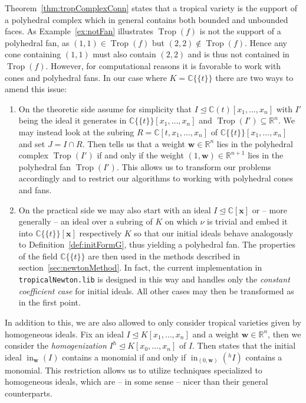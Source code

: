 \documentclass[
  paper=a4,
  titlepage,
  bibliography=totoc,
  listof=totoc,
  pagesize=pdftex
]{scrartcl}
\numberwithin{figure}{section}
\numberwithin{equation}{section}
\numberwithin{table}{section}
\newcommand*\setR{\mathds{R}}
\newcommand*\setC{\mathds{C}}
\newcommand*\puiseux[2]{#1\{\!\{#2\}\!\}}
\newcommand*\CCt{\puiseux{\setC}{t}}
\let\vec\mathbf
\let\idealof\trianglelefteq
\DeclareMathOperator{\Trop}{Trop}
\DeclareMathOperator{\initial}{in}
\theoremstyle{definition}
\numberwithin{definition}{section}
\begin{document}
Theorem~\ref{thm:tropComplexConn} states that a tropical variety is the support of a
polyhedral complex which in general contains both bounded and unbounded faces. As
Example~\ref{ex:notFan} illustrates $\Trop(f)$ is not the support of a polyhedral fan, as
$(1,1) \in \Trop(f)$ but $(2,2) \not\in \Trop(f)$. Hence any cone containing $(1,1)$ must
also contain $(2,2)$ and is thus not contained in $\Trop(f)$. However, for computational
reasons it is favorable to work with cones and polyhedral fans. In our case where $K =
\CCt$ there are two ways to amend this issue:
\begin{enumerate}[label=\arabic*.]
  \item On the theoretic side assume for simplicity that $I \idealof \setC(t)[x_1, \dots,
    x_n]$ with $I'$ being the ideal it generates in $\CCt[x_1, \dots, x_n]$ and $\Trop(I')
    \subseteq \setR^n$. We may instead look at the subring $R = \setC[t, x_1, \dots, x_n]$ of
    $\CCt[x_1, \dots, x_n]$ and set $J = I\cap R$. Then \cite[Lemma~1.1]{compTropVar}
    tells us that a weight $\vec w \in \setR^n$ lies in the polyhedral complex $\Trop(I')$
    if and only if the weight $(1,\vec w) \in \setR^{n+1}$ lies in the polyhedral fan
    $\Trop(I')$. This allows us to transform our problems accordingly and to restrict our
    algorithms to working with polyhedral cones and fans.
  \item On the practical side we may also start with an ideal $I \idealof \setC[\vec x]$
    or -- more generally -- an ideal over a subring of $K$ on which $\nu$ is trivial and
    embed it into $\CCt[\vec x]$ respectively $K$ so that our initial ideals behave
    analogously to Definition~\ref{def:initFormG}, thus yielding a polyhedral fan. The
    properties of the field $\CCt$ are then used in the methods described in
    section~\ref{sec:newtonMethod}. In fact, the current implementation in
    \texttt{tropicalNewton.lib} \cite{tropNewtLib} is designed in this way and handles
    only the \emph{constant coefficient case} for initial ideals. All other cases may then
    be transformed as in the first point.
\end{enumerate}
In addition to this, we are also allowed to only consider tropical varieties given by
homogeneous ideals. Fix an ideal $I\idealof K[x_1, \dots, x_n]$ and a weight $\vec w \in
\setR^n$, then we consider the \emph{homogenization} $I^h \idealof K[x_0, \dots, x_n]$ of
$I$. Then \cite[Lemma~2.2]{compTropVar} states that the initial ideal $\initial_{\vec
w}(I)$ contains a monomial if and only if $\initial_{(0,\vec w)}(^hI)$ contains a
monomial. This restriction allows us to utilize techniques specialized to homogeneous
ideals, which are -- in some sense -- nicer than their general counterparts.
\end{document}
